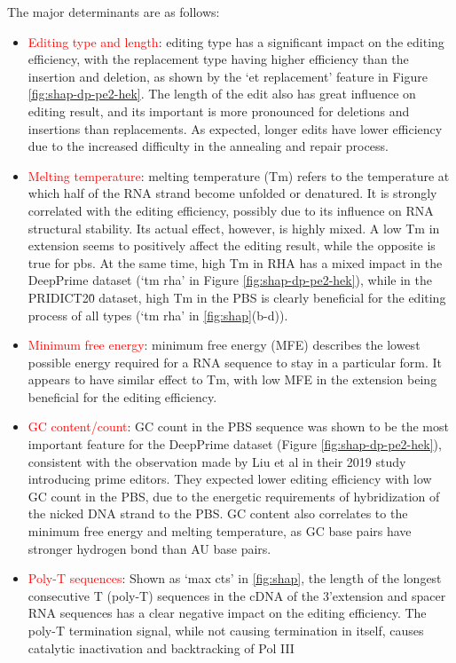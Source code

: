 The major determinants are as follows:
\begin{itemize}[itemsep=-0mm]
    \item \textcolor{red}{Editing type and length}: editing type has a significant impact on the editing efficiency, with the replacement type having higher efficiency than the insertion and deletion, as shown by the `et replacement' feature in Figure \ref{fig:shap-dp-pe2-hek}. The length of the edit also has great influence on editing result, and its important is more pronounced for deletions and insertions than replacements. As expected, longer edits have lower efficiency due to the increased difficulty in the annealing and repair process.
    \item \textcolor{red}{Melting temperature}: melting temperature (Tm) refers to the temperature at which half of the RNA strand become unfolded or denatured. It is strongly correlated with the editing efficiency, possibly due to its influence on RNA structural stability. Its actual effect, however, is highly mixed. A low Tm in extension seems to positively affect the editing result, while the opposite is true for pbs. At the same time, high Tm in RHA has a mixed impact in the DeepPrime dataset (`tm rha' in Figure \ref{fig:shap-dp-pe2-hek}), while in the PRIDICT2\.0 dataset, high Tm in the PBS is clearly beneficial for the editing process of all types (`tm rha' in \autoref{fig:shap}(b-d)).
    \item \textcolor{red}{Minimum free energy}: minimum free energy (MFE) describes the lowest possible energy required for a RNA sequence to stay in a particular form\cite{lorenzViennaRNAPackage2011}. It appears to have similar effect to Tm, with low MFE in the extension being beneficial for the editing efficiency.
    \item \textcolor{red}{GC content/count}: GC count in the PBS sequence was shown to be the most important feature for the DeepPrime dataset (Figure \ref{fig:shap-dp-pe2-hek}), consistent with the observation made by Liu et al in their 2019 study introducing prime editors\cite{liudavidr.SearchandreplaceGenomeEditing2019}. They expected lower editing efficiency with low GC count in the PBS, due to the energetic requirements of hybridization of the nicked DNA strand to the PBS. GC content also correlates to the minimum free energy and melting temperature, as GC base pairs have stronger hydrogen bond than AU base pairs.
    \item \textcolor{red}{Poly-T sequences}: Shown as `max cts' in \autoref{fig:shap}, the length of the longest consecutive T (poly-T) sequences in the cDNA of the 3'extension and spacer RNA sequences has a clear negative impact on the editing efficiency. The poly-T termination signal, while not causing termination in itself, causes catalytic inactivation and backtracking of Pol III\cite{nielsenMechanismEukaryoticRNA2013}

\end{itemize}
